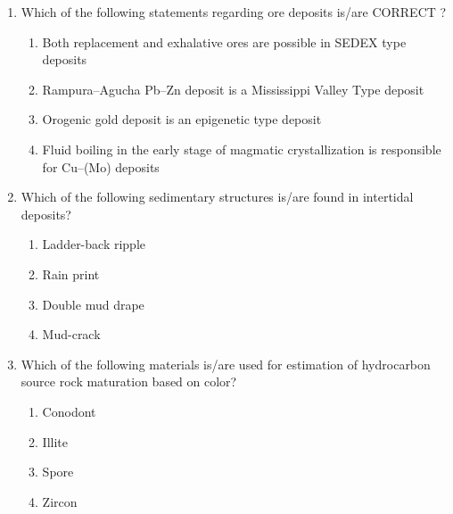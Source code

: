 \documentclass[journal,12pt,onecolumn]{IEEEtran}
\begin{document}
\begin{enumerate}
\hfill{}

\begin{multicols}{4}
\begin{enumerate}
\item acuity
\item albedo
\item spectral hue
\item artifact
\end{enumerate}
\end{multicols}

\item Which of the following statements regarding ore deposits is/are CORRECT ?  

\hfill{}


\begin{enumerate}
\item Both replacement and exhalative ores are possible in SEDEX type deposits
\item Rampura--Agucha Pb--Zn deposit is a Mississippi Valley Type deposit
\item Orogenic gold deposit is an epigenetic type deposit
\item Fluid boiling in the early stage of magmatic crystallization is responsible for Cu--(Mo) deposits
\end{enumerate}


\item Which of the following sedimentary structures is/are found in intertidal deposits?  

\hfill{}

\begin{multicols}{2}
\begin{enumerate}
\item Ladder-back ripple
\item Rain print
\item Double mud drape
\item Mud-crack
\end{enumerate}
\end{multicols}

\item Which of the following materials is/are used for estimation of hydrocarbon source rock maturation based on color?  

\hfill{}

\begin{multicols}{2}
\begin{enumerate}
\item Conodont
\item Illite
\item Spore
\item Zircon
\end{enumerate}
\end{multicols}


\end{enumerate}
\end{document}
